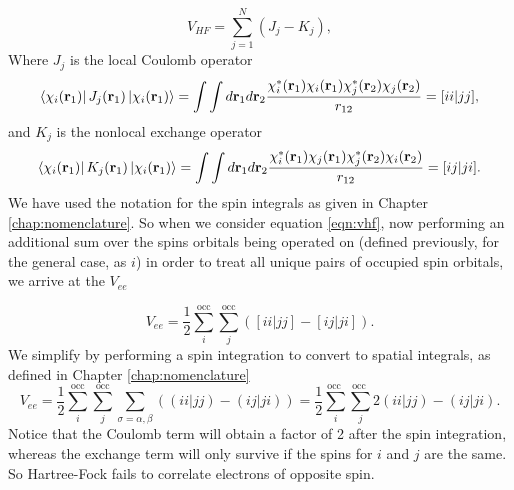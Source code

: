 \documentclass[12pt]{caltech_thesis}
\begin{document}
\begin{equation}
    V_{HF} = \sum_{j=1}^{N} \left( J_j - K_j \right),
\label{eqn:vhf}
\end{equation}
Where $J_j$ is the local Coulomb operator
\begin{equation}
    \bra{\chi_i(\mathbf{r}_1)} J_j(\mathbf{r}_1) \ket{\chi_i(\mathbf{r}_1)} = \int \int d\mathbf{r}_1 d\mathbf{r}_2 \frac{\chi_i^*(\mathbf{r}_1) \chi_i(\mathbf{r}_1) \chi_j^*(\mathbf{r}_2) \chi_j(\mathbf{r}_2)}{r_{12}}=[ii|jj],
\end{equation}
 and $K_j$ is the nonlocal exchange operator
\begin{equation}
    \bra{\chi_i(\mathbf{r}_1)} K_j(\mathbf{r}_1) \ket{\chi_i(\mathbf{r}_1)} = \int \int d\mathbf{r}_1 d\mathbf{r}_2 \frac{\chi_i^*(\mathbf{r}_1) \chi_j(\mathbf{r}_1) \chi_j^*(\mathbf{r}_2) \chi_i(\mathbf{r}_2)}{r_{12}}=[ij|ji].
\end{equation}
We have used the notation for the spin integrals as given in Chapter \ref{chap:nomenclature}. So when we consider equation \ref{eqn:vhf}, now performing an additional sum over the spins orbitals being operated on (defined previously, for the general case, as $i$) in order to treat all unique pairs of occupied spin orbitals, we arrive at the $V_{ee}$


\begin{equation}
    V_{ee} = \frac{1}{2} \sum_{{i}}^{\text{occ}} \sum_{{j}}^{\text{occ}} \left( [{i}{i}|{j}{j}] - [{i}{j}|{j}{i}] \right).
\end{equation}
 We simplify by performing a spin integration to convert to spatial integrals, as defined in Chapter \ref{chap:nomenclature}
\begin{equation}
    V_{ee} = \frac{1}{2} \sum_{{i}}^{\text{occ}} \sum_{{j}}^{\text{occ}} \sum_{\sigma = \alpha, \beta} \left( (ii|jj) - (ij|ji) \right) = \frac{1}{2} \sum_i^{\text {occ }} \sum_j^{\text {occ }} 2(ii|jj) - (ij|ji).
\end{equation}
Notice that the Coulomb term will obtain a factor of 2 after the spin integration, whereas the exchange term will only survive if the spins for $i$ and $j$ are the same. So Hartree-Fock fails to correlate electrons of opposite spin.
\end{document}
